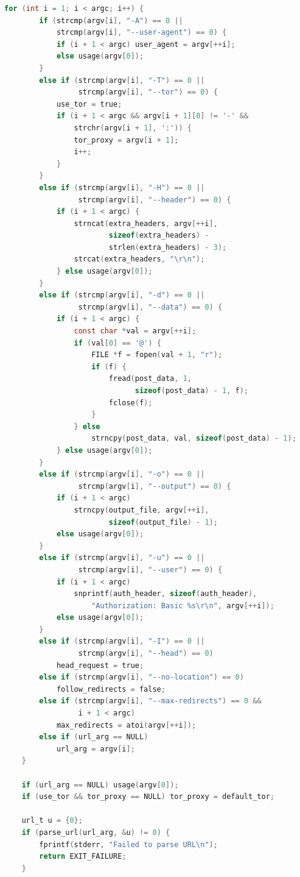 \begin{lstlisting}[style=oldcode,language=C,firstnumber=last]
    for (int i = 1; i < argc; i++) {
        if (strcmp(argv[i], "-A") == 0 ||
            strcmp(argv[i], "--user-agent") == 0) {
            if (i + 1 < argc) user_agent = argv[++i];
            else usage(argv[0]);
        }
        else if (strcmp(argv[i], "-T") == 0 ||
                 strcmp(argv[i], "--tor") == 0) {
            use_tor = true;
            if (i + 1 < argc && argv[i + 1][0] != '-' &&
                strchr(argv[i + 1], ':')) {
                tor_proxy = argv[i + 1];
                i++;
            }
        }
        else if (strcmp(argv[i], "-H") == 0 ||
                 strcmp(argv[i], "--header") == 0) {
            if (i + 1 < argc) {
                strncat(extra_headers, argv[++i],
                        sizeof(extra_headers) -
                        strlen(extra_headers) - 3);
                strcat(extra_headers, "\r\n");
            } else usage(argv[0]);
        }
        else if (strcmp(argv[i], "-d") == 0 ||
                 strcmp(argv[i], "--data") == 0) {
            if (i + 1 < argc) {
                const char *val = argv[++i];
                if (val[0] == '@') {
                    FILE *f = fopen(val + 1, "r");
                    if (f) {
                        fread(post_data, 1,
                              sizeof(post_data) - 1, f);
                        fclose(f);
                    }
                } else
                    strncpy(post_data, val, sizeof(post_data) - 1);
            } else usage(argv[0]);
        }
        else if (strcmp(argv[i], "-o") == 0 ||
                 strcmp(argv[i], "--output") == 0) {
            if (i + 1 < argc)
                strncpy(output_file, argv[++i],
                        sizeof(output_file) - 1);
            else usage(argv[0]);
        }
        else if (strcmp(argv[i], "-u") == 0 ||
                 strcmp(argv[i], "--user") == 0) {
            if (i + 1 < argc)
                snprintf(auth_header, sizeof(auth_header),
                    "Authorization: Basic %s\r\n", argv[++i]);
            else usage(argv[0]);
        }
        else if (strcmp(argv[i], "-I") == 0 ||
                 strcmp(argv[i], "--head") == 0)
            head_request = true;
        else if (strcmp(argv[i], "--no-location") == 0)
            follow_redirects = false;
        else if (strcmp(argv[i], "--max-redirects") == 0 &&
                 i + 1 < argc)
            max_redirects = atoi(argv[++i]);
        else if (url_arg == NULL)
            url_arg = argv[i];
    }

    if (url_arg == NULL) usage(argv[0]);
    if (use_tor && tor_proxy == NULL) tor_proxy = default_tor;

    url_t u = {0};
    if (parse_url(url_arg, &u) != 0) {
        fprintf(stderr, "Failed to parse URL\n");
        return EXIT_FAILURE;
    }
\end{lstlisting}
